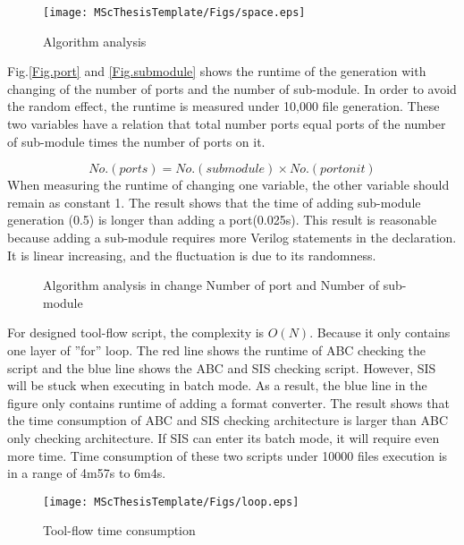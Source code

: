\begin{figure}[htbp]
\centering
\label{Fig.sub.2}
\texttt{[image: MScThesisTemplate/Figs/space.eps]}
\caption{\footnotesize Algorithm analysis}
\end{figure}

Fig.\ref{Fig.port} and \ref{Fig.submodule} shows the runtime of the generation with changing of the number of ports and the number of sub-module. In order to avoid the random effect, the runtime is measured under 10,000 file generation. These two variables have a relation that total number ports equal ports of the number of sub-module times the number of ports on it.

\begin{equation}
    No.(ports) = No.(submodule) \times No.(port on it)
\end{equation}
When measuring the runtime of changing one variable, the other variable should remain as constant 1. The result shows that the time of adding sub-module generation (0.5) is longer than adding a port(0.025s). This result is reasonable because adding a sub-module requires more Verilog statements in the declaration. It is linear increasing, and the fluctuation is due to its randomness.

\begin{figure}[htbp]
\centering
{}
\caption{\footnotesize Algorithm analysis in change Number of port and Number of sub-module}
\end{figure}
For designed tool-flow script, the complexity is $O(N)$. Because it only contains one layer of ''for'' loop. The red line shows the runtime of ABC checking the script and the blue line shows the ABC and SIS checking script. However, SIS will be stuck when executing in batch mode. As a result, the blue line in the figure only contains runtime of adding a format converter. The result shows that the time consumption of ABC and SIS checking architecture is larger than ABC only checking architecture. If SIS can enter its batch mode, it will require even more time.  Time consumption of these two scripts under 10000 files execution is in a range of 4m57s to 6m4s. 
\begin{figure}[htbp]
    \centering
    \texttt{[image: MScThesisTemplate/Figs/loop.eps]}
    \caption{Tool-flow time consumption}
    \label{fig:loop}
\end{figure}


